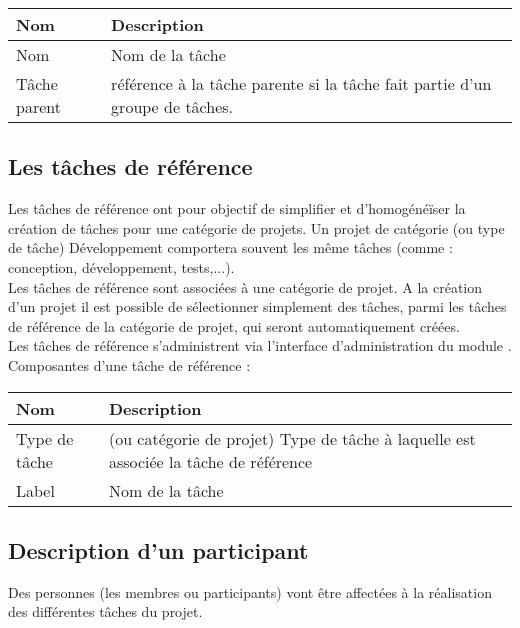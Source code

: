\begin{tabular}{|p{3cm}|p{10cm}|}
\hline
\textbf{Nom} & \textbf{Description} \\
\hline
Nom & Nom de la tâche \\
\hline
Tâche parent & référence à la tâche parente si la tâche fait partie d'un groupe de tâches.\\
\hline
\end{tabular}


\subsection{Les tâches de référence}

Les tâches de référence ont pour objectif de simplifier et d'homogénéïser la création de tâches pour une catégorie de projets.
Un projet de catégorie (ou type de tâche) Développement comportera souvent les même tâches (comme : conception, développement, tests,...).\\

Les tâches de référence sont associées à une catégorie de projet.
A la création d'un projet il est possible de sélectionner simplement des tâches, parmi les tâches de référence de la catégorie de projet, qui seront automatiquement créées.\\

Les tâches de référence s'administrent via l'interface d'administration du module \project.\\

Composantes d'une tâche de référence :\\

\begin{tabular}{|p{3cm}|p{10cm}|}
\hline
\textbf{Nom} & \textbf{Description} \\
\hline
Type de tâche & (ou catégorie de projet) Type de tâche à laquelle est associée la tâche de référence \\
\hline
Label & Nom de la tâche \\
\hline
\end{tabular}


\subsection{Description d'un participant}

Des personnes (les membres ou participants) vont être affectées à la réalisation des différentes tâches du projet.\\

